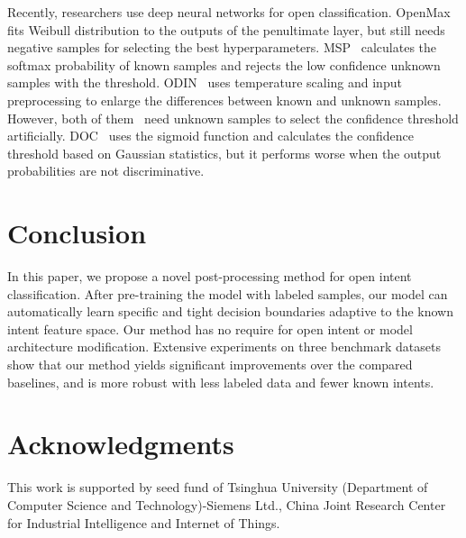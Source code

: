 \documentclass[letterpaper]{article} %
\begin{document}
	Recently, researchers use deep neural networks for open classification. OpenMax~\cite{bendale2016towards} fits Weibull distribution to the outputs of the penultimate layer, but still needs negative samples for selecting the best hyperparameters. MSP~\cite{hendrycks17baseline} calculates the softmax probability of known samples and rejects the low confidence unknown samples with the threshold. ODIN~\cite{liang2018enhancing} uses temperature scaling and input preprocessing to enlarge the differences between known and unknown samples. However, both of them~\cite{hendrycks17baseline,liang2018enhancing} need unknown samples to select the confidence threshold  artificially. DOC~\cite{Shu2017DOCDO} uses the sigmoid function and calculates the confidence threshold based on Gaussian statistics, but it performs worse when the output probabilities are not discriminative. 
	
	\section{Conclusion}
	In this paper, we propose a novel post-processing method for open intent classification. After pre-training the model with labeled samples, our model can automatically learn specific and tight decision boundaries adaptive to the known intent feature space. Our method has no require for open intent or model architecture modification. Extensive experiments on three benchmark datasets show that our method yields significant improvements over the compared baselines, and is more robust with less labeled data and fewer known intents.
	
	\section{Acknowledgments}
	This work is supported by seed fund of Tsinghua University (Department of Computer Science and Technology)-Siemens Ltd., China Joint Research Center for Industrial Intelligence and Internet of Things. 
	
	
\end{document}
